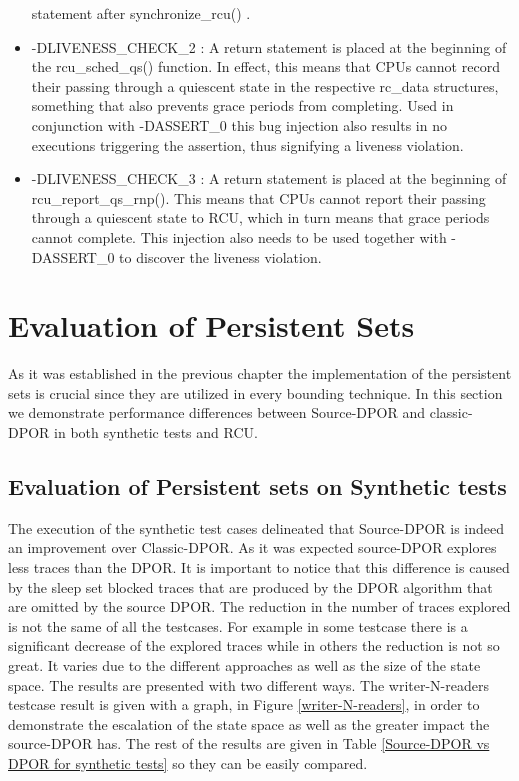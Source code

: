 \begin{itemize}
statement after synchronize\_rcu() .
\item
-DLIVENESS\_CHECK\_2 : A return statement is placed at the beginning of the rcu\_sched\_qs() function. In effect, this means 
that CPUs cannot record their passing through a
quiescent state in the respective rc\_data structures, something that also prevents grace periods from 
completing. Used in conjunction with -DASSERT\_0 this bug injection
also results in no executions triggering the assertion, thus signifying a liveness violation.
\item
-DLIVENESS\_CHECK\_3 : A return statement is placed at the beginning of rcu\_report\_qs\_rnp(). 
This means that CPUs cannot report their passing through a quiescent state to
RCU, which in turn means that grace periods cannot complete. This injection also needs to be used together 
with -DASSERT\_0 to discover the liveness violation.

\end{itemize}

\section{Evaluation of Persistent Sets}
As it was established in the previous chapter the implementation of the persistent sets
is crucial since they are utilized in every bounding technique. 
In this section we demonstrate performance differences between Source-DPOR and classic-DPOR in both synthetic tests and RCU.

\subsection{Evaluation of Persistent sets on Synthetic tests}
The execution of the synthetic test cases delineated that Source-DPOR is indeed an improvement over Classic-DPOR. As it was expected source-DPOR explores less 
traces than the DPOR. It is important
to notice that this difference is caused by the sleep set blocked traces that are produced by the DPOR algorithm that are omitted by the source DPOR. 
The reduction in the number of traces explored is not the same of all the testcases. For example in some testcase there is a
significant decrease of the explored traces while in others the reduction is not so great. 
It varies due to the different approaches as well as the size of the state space. The results are presented with two different ways. 
The writer-N-readers testcase result is given with a graph, in Figure \ref{writer-N-readers}, in order to demonstrate the escalation of the state space as well as the greater impact the source-DPOR has. The rest of the
results are given in Table \ref{Source-DPOR vs DPOR for synthetic tests} so they can be easily compared.

